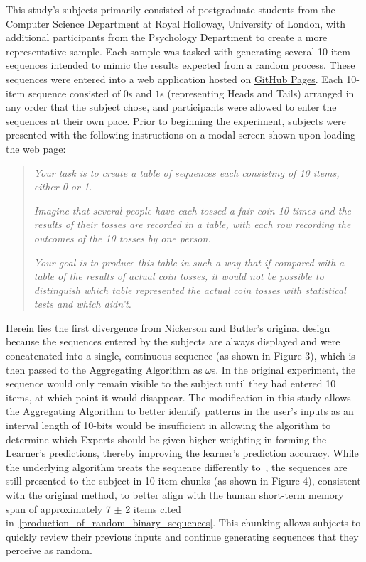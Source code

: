 This study's subjects primarily consisted of postgraduate students from the Computer Science Department at Royal Holloway, University of London, with additional participants from the Psychology Department to create a more representative sample. Each sample was tasked with generating several 10-item sequences intended to mimic the results expected from a random process. These sequences were entered into a web application hosted on \href{https://arbarraclough.github.io/aggregating_algorithm/}{GitHub Pages}. Each 10-item sequence consisted of $0$s and $1$s (representing Heads and Tails) arranged in any order that the subject chose, and participants were allowed to enter the sequences at their own pace. Prior to beginning the experiment, subjects were presented with the following instructions on a modal screen shown upon loading the web page:

\begin{quote}
    \textit{Your task is to create a table of sequences each consisting of 10 items, either 0 or 1.}

    \textit{Imagine that several people have each tossed a fair coin 10 times and the results of their tosses are recorded in a table, with each row recording the outcomes of the 10 tosses by one person.}

    \textit{Your goal is to produce this table in such a way that if compared with a table of the results of actual coin tosses, it would not be possible to distinguish which table represented the actual coin tosses with statistical tests and which didn't.}
\end{quote}

Herein lies the first divergence from Nickerson and Butler's original design because the sequences entered by the subjects are always displayed and were concatenated into a single, continuous sequence (as shown in Figure 3), which is then passed to the Aggregating Algorithm as $\omega$s. In the original experiment, the sequence would only remain visible to the subject until they had entered 10 items, at which point it would disappear. The modification in this study allows the Aggregating Algorithm to better identify patterns in the user's inputs as an interval length of 10-bits would be insufficient in allowing the algorithm to determine which Experts should be given higher weighting in forming the Learner's predictions, thereby improving the learner's prediction accuracy. While the underlying algorithm treats the sequence differently to~\cite{nickerson:2009}, the sequences are still presented to the subject in 10-item chunks (as shown in Figure 4), consistent with the original method, to better align with the human short-term memory span of approximately 7 $\pm$ 2 items cited in~\ref{production_of_random_binary_sequences}. This chunking allows subjects to quickly review their previous inputs and continue generating sequences that they perceive as random.

